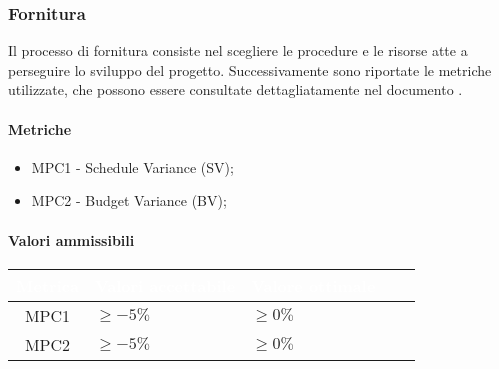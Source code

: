 \subsubsection{Fornitura}
Il processo di fornitura consiste nel scegliere le procedure e le risorse atte a perseguire lo sviluppo del progetto. Successivamente sono riportate le metriche utilizzate, che possono essere consultate dettagliatamente nel documento .
\paragraph{Metriche}
\begin{itemize}
	\item MPC1 - Schedule Variance (SV);
	\item MPC2 - Budget Variance (BV);
\end{itemize}

\paragraph{Valori ammissibili}
{
\renewcommand{\arraystretch}{1.5}
\centering
\begin{longtable}{c C{2.6cm} C{3cm} C{2.6cm} C{5cm}}
\textcolor{white}{\textbf{Metrica}}&
\textcolor{white}{\textbf{Valori accettabile}}&
\textcolor{white}{\textbf{Valore ottimale}}\\	
\endhead

MPC1 & $\geq -5\% $  & $\geq 0 \% $  \\
MPC2 & $\geq -5\% $  & $\geq 0 \% $
\end{longtable}
}